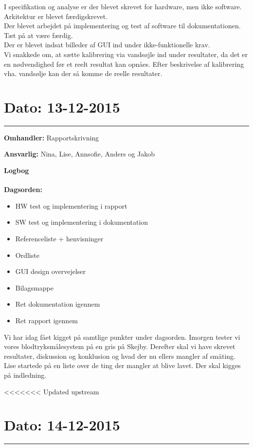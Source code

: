 I specifikation og analyse er der blevet skrevet for hardware, men ikke software.\\
Arkitektur er blevet færdigskrevet. \\
Der blevet arbejdet på implementering og test af software til dokumentationen. Tæt på at være færdig.\\
Der er blevet indsat billeder af GUI ind under ikke-funktionelle krav.\\
Vi snakkede om, at sætte kalibrering via vandsøjle ind under resultater, da det er en nødvendighed før et reelt resultat kan opnåes. Efter beskrivelse af kalibrering vha. vandsølje kan der så komme de reelle resultater.

	
	
	
\section{Dato: 13-12-2015 }
\hrule

\textbf{Omhandler:} Rapportskrivning

\textbf{Ansvarlig:} Nina, Lise, Annsofie, Anders og Jakob

\textbf{Logbog}
\\
\\
\textbf{Dagsorden:}
\begin{itemize}
	\item HW test og implementering i rapport
	\item SW test og implementering i dokumentation
	\item Referenceliste + henvisninger
	\item Ordliste
	\item GUI design overvejelser
	\item Bilagsmappe
	\item Ret dokumentation igennem
	\item Ret rapport igennem
\end{itemize}

Vi har idag fået kigget på samtlige punkter under dagsorden.
Imorgen tester vi vores blodtryksmålesystem på en gris på Skejby.
Derefter skal vi have skrevet resultater, diskussion og konklusion og hvad der nu ellers mangler af småting. 
Lise startede på en liste over de ting der mangler at blive lavet. 
Der skal kigges på indledning.
	
	
	
	
<<<<<<< Updated upstream
\section{Dato: 14-12-2015 }
\hrule

